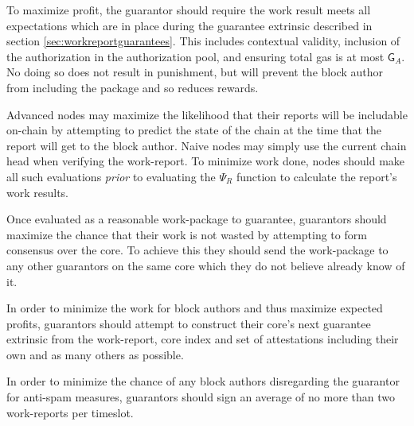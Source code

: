 To maximize profit, the guarantor should require the work result meets all expectations which are in place during the guarantee extrinsic described in section \ref{sec:workreportguarantees}. This includes contextual validity, inclusion of the authorization in the authorization pool, and ensuring total gas is at most $\mathsf{G}_A$. No doing so does not result in punishment, but will prevent the block author from including the package and so reduces rewards.

Advanced nodes may maximize the likelihood that their reports will be includable on-chain by attempting to predict the state of the chain at the time that the report will get to the block author. Naive nodes may simply use the current chain head when verifying the work-report. To minimize work done, nodes should make all such evaluations \emph{prior} to evaluating the $\Psi_R$ function to calculate the report's work results.

Once evaluated as a reasonable work-package to guarantee, guarantors should maximize the chance that their work is not wasted by attempting to form consensus over the core. To achieve this they should send the work-package to any other guarantors on the same core which they do not believe already know of it.

In order to minimize the work for block authors and thus maximize expected profits, guarantors should attempt to construct their core's next guarantee extrinsic from the work-report, core index and set of attestations including their own and as many others as possible.

In order to minimize the chance of any block authors disregarding the guarantor for anti-spam measures, guarantors should sign an average of no more than two work-reports per timeslot.
